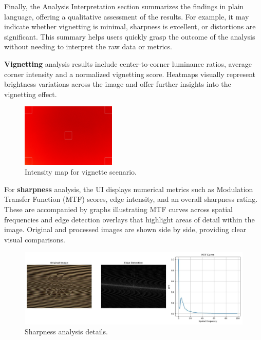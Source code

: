 Finally, the Analysis Interpretation section summarizes the findings in plain language, offering a qualitative assessment of the results. For example, it may indicate whether vignetting is minimal, sharpness is excellent, or distortions are significant. This summary helps users quickly grasp the outcome of the analysis without needing to interpret the raw data or metrics.



\textbf{Vignetting} analysis results include center-to-corner luminance ratios, average corner intensity and a normalized vignetting score. Heatmaps visually represent brightness variations across the image and offer further insights into the vignetting effect.

\begin{figure}[hbt]
\centering
\includegraphics[width=0.4\textwidth]{Images/vignette_image_result.png}
\caption{Intensity map for vignette scenario.}
\label{fig:ui_vignette_intensity_map}
\end{figure}

For \textbf{sharpness} analysis, the UI displays numerical metrics such as Modulation Transfer Function (MTF) scores, edge intensity, and an overall sharpness rating. These are accompanied by graphs illustrating MTF curves across spatial frequencies and edge detection overlays that highlight areas of detail within the image. Original and processed images are shown side by side, providing clear visual comparisons.

\begin{figure}[h]
\centering
\includegraphics[width=1\textwidth]{Images/sharpness_image_result.jpg}
\caption{Sharpness analysis details.}
\label{fig:ui_sharpness_image}
\end{figure}

